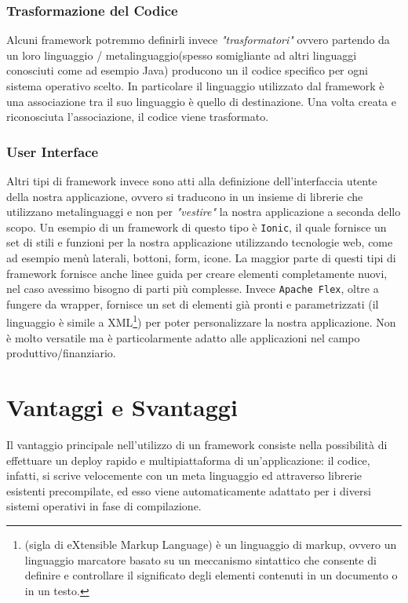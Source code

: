 \subsubsection{Trasformazione del Codice}
Alcuni framework potremmo definirli invece \emph{"trasformatori"} ovvero partendo da un loro linguaggio / metalinguaggio(spesso somigliante ad altri linguaggi conosciuti come ad esempio Java) producono un il codice specifico per ogni sistema operativo scelto.
In particolare il linguaggio utilizzato dal framework è una associazione tra il suo linguaggio è quello di destinazione. Una volta creata e riconosciuta l'associazione, il codice viene trasformato.
\subsubsection{User Interface}
Altri tipi di framework invece sono atti alla definizione dell'interfaccia utente della nostra applicazione, ovvero si traducono in un insieme di librerie che utilizzano metalinguaggi e non per \emph{"vestire"} la nostra applicazione a seconda dello scopo.
Un esempio di un framework di questo tipo è \texttt{Ionic}, il quale fornisce un set di stili e funzioni per la nostra applicazione utilizzando tecnologie web, come ad esempio menù laterali, bottoni, form, icone. La maggior parte di questi tipi di framework fornisce anche linee guida per creare elementi completamente nuovi, nel caso avessimo bisogno di parti più complesse.
Invece \texttt{Apache Flex}, oltre a fungere da wrapper, fornisce un set di elementi già pronti e parametrizzati (il linguaggio è simile a XML\footnote{(sigla di eXtensible Markup Language) è un linguaggio di markup, ovvero un linguaggio marcatore basato su un meccanismo sintattico che consente di definire e controllare il significato degli elementi contenuti in un documento o in un testo.\citeauthor{wiki:xml}}) per poter personalizzare la nostra applicazione. Non è molto versatile ma è particolarmente adatto alle applicazioni nel campo produttivo/finanziario.
\section{Vantaggi e Svantaggi}
Il vantaggio principale nell’utilizzo di un framework consiste nella possibilità di effettuare un deploy rapido e multipiattaforma di un’applicazione: il codice, infatti, si scrive velocemente con un meta linguaggio ed attraverso librerie esistenti precompilate, ed esso viene automaticamente adattato per i diversi sistemi operativi in fase di compilazione.

